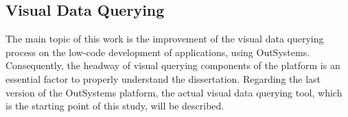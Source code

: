 
\subsection{Visual Data Querying}
\label{subsec:visual_data_querying}

The main topic of this work is the improvement of the visual data querying process on the low-code development of applications, using OutSystems. Consequently, the headway of visual querying components of the platform is an essential factor to properly understand the dissertation. Regarding the last version of the OutSystems platform, the actual visual data querying tool, which is the starting point of this study, will be described.

